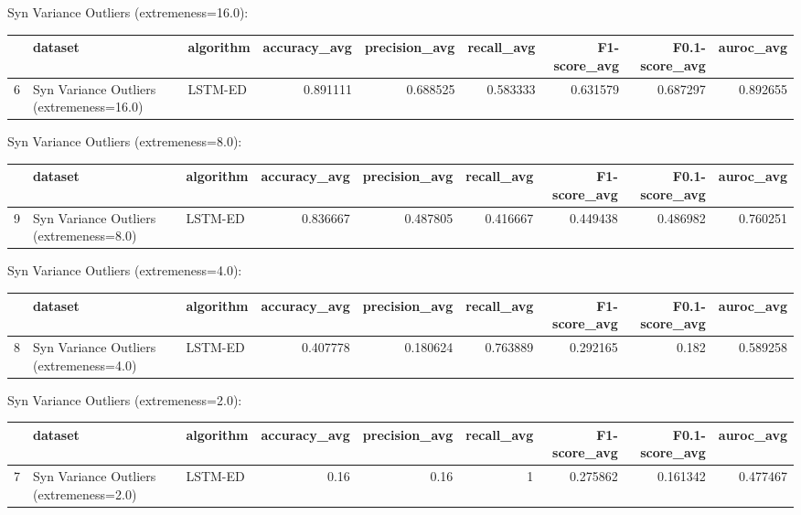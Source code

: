 Syn Variance Outliers (extremeness=16.0):

\begin{tabular}{rllrrrrrr}
\hline
    & dataset                                  & algorithm   &   accuracy\_avg &   precision\_avg &   recall\_avg &   F1-score\_avg &   F0.1-score\_avg &   auroc\_avg \\
\hline
  6 & Syn Variance Outliers (extremeness=16.0) & LSTM-ED     &       0.891111 &        0.688525 &     0.583333 &       0.631579 &         0.687297 &    0.892655 \\
\hline
\end{tabular}

Syn Variance Outliers (extremeness=8.0):

\begin{tabular}{rllrrrrrr}
\hline
    & dataset                                 & algorithm   &   accuracy\_avg &   precision\_avg &   recall\_avg &   F1-score\_avg &   F0.1-score\_avg &   auroc\_avg \\
\hline
  9 & Syn Variance Outliers (extremeness=8.0) & LSTM-ED     &       0.836667 &        0.487805 &     0.416667 &       0.449438 &         0.486982 &    0.760251 \\
\hline
\end{tabular}

Syn Variance Outliers (extremeness=4.0):

\begin{tabular}{rllrrrrrr}
\hline
    & dataset                                 & algorithm   &   accuracy\_avg &   precision\_avg &   recall\_avg &   F1-score\_avg &   F0.1-score\_avg &   auroc\_avg \\
\hline
  8 & Syn Variance Outliers (extremeness=4.0) & LSTM-ED     &       0.407778 &        0.180624 &     0.763889 &       0.292165 &            0.182 &    0.589258 \\
\hline
\end{tabular}

Syn Variance Outliers (extremeness=2.0):

\begin{tabular}{rllrrrrrr}
\hline
    & dataset                                 & algorithm   &   accuracy\_avg &   precision\_avg &   recall\_avg &   F1-score\_avg &   F0.1-score\_avg &   auroc\_avg \\
\hline
  7 & Syn Variance Outliers (extremeness=2.0) & LSTM-ED     &           0.16 &            0.16 &            1 &       0.275862 &         0.161342 &    0.477467 \\
\hline
\end{tabular}

